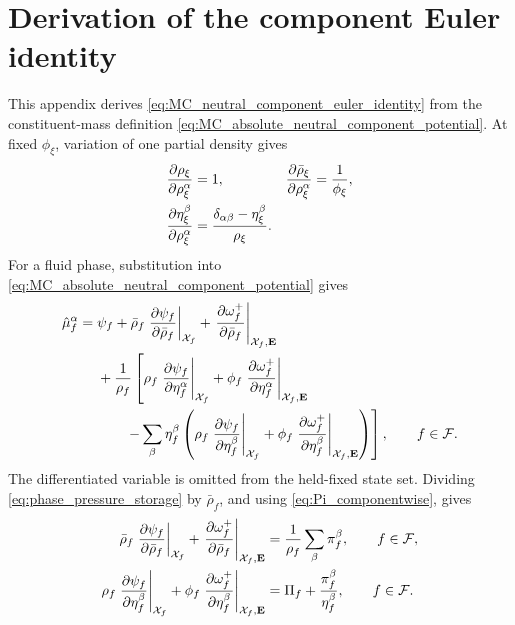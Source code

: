 \section{Derivation of the component Euler identity}
\label{app:component_potential_euler_derivation}

This appendix derives
\eqref{eq:MC_neutral_component_euler_identity} from the constituent-mass
definition \eqref{eq:MC_absolute_neutral_component_potential}.  At fixed
\(\phi_\xi\), variation of one partial density gives
%
\begin{subequations}
	\label{eq:appendix_component_density_chain_rule}
	\begin{align}
		\frac{\partial \rho_\xi}{\partial \rho_\xi^\alpha}
		&=1,
		&
		\frac{\partial \bar\rho_\xi}{\partial \rho_\xi^\alpha}
		&=\frac{1}{\phi_\xi},
		\label{eq:appendix_total_intrinsic_density_derivatives}
		\\
		\frac{\partial \eta_\xi^\beta}{\partial \rho_\xi^\alpha}
		&=
		\frac{
			\delta_{\alpha\beta}-\eta_\xi^\beta
		}{
			\rho_\xi
		}.
		\label{eq:appendix_mass_fraction_partial_density_derivative}
	\end{align}
\end{subequations}
%
For a fluid phase, substitution into
\eqref{eq:MC_absolute_neutral_component_potential} gives
%
\begin{align}
	\hat\mu_f^\alpha
	={} &
	\psi_f
	+
	\bar\rho_f
	\left.
	\frac{\partial \psi_f}{\partial \bar\rho_f}
	\right\vert_{\mathcal{X}_f}
	+
	\left.
	\frac{\partial \omega_f^+}{\partial \bar\rho_f}
	\right\vert_{\mathcal{X}_f,\mathbf{E}}
	\notag \\
	&+
	\frac{1}{\rho_f}
	\left[
		\rho_f
		\left.
		\frac{\partial \psi_f}{\partial \eta_f^\alpha}
		\right\vert_{\mathcal{X}_f}
		+
		\phi_f
		\left.
		\frac{\partial \omega_f^+}{\partial \eta_f^\alpha}
		\right\vert_{\mathcal{X}_f,\mathbf{E}}
	\right.
	\notag \\
	&\left.
	\qquad
		-\sum_\beta\eta_f^\beta
		\left(
			\rho_f
			\left.
			\frac{\partial \psi_f}{\partial \eta_f^\beta}
			\right\vert_{\mathcal{X}_f}
			+
			\phi_f
			\left.
			\frac{\partial \omega_f^+}{\partial \eta_f^\beta}
			\right\vert_{\mathcal{X}_f,\mathbf{E}}
			\right)
	\right],
	\qquad
	f\in\mathcal{F} .
	\label{eq:appendix_component_potential_chain_rule}
\end{align}
%
The differentiated variable is omitted from the held-fixed state set.
Dividing \eqref{eq:phase_pressure_storage} by \(\bar\rho_f\), and using
\eqref{eq:Pi_componentwise}, gives
%
\begin{subequations}
	\label{eq:appendix_component_stationarity_substitutions}
	\begin{align}
		\bar\rho_f
		\left.
		\frac{\partial \psi_f}{\partial \bar\rho_f}
		\right\vert_{\mathcal{X}_f}
		+
		\left.
		\frac{\partial \omega_f^+}{\partial \bar\rho_f}
		\right\vert_{\mathcal{X}_f,\mathbf{E}}
		&=
		\frac{1}{\rho_f}
		\sum_\beta\pi_f^\beta,
		\qquad
		f\in\mathcal{F},
		\label{eq:appendix_density_stationarity_substitution}
		\\
		\rho_f
		\left.
		\frac{\partial \psi_f}{\partial \eta_f^\beta}
		\right\vert_{\mathcal{X}_f}
		+
		\phi_f
		\left.
		\frac{\partial \omega_f^+}{\partial \eta_f^\beta}
		\right\vert_{\mathcal{X}_f,\mathbf{E}}
		&=
		\Pi_f
		+
		\frac{\pi_f^\beta}{\eta_f^\beta},
		\qquad
		f\in\mathcal{F} .
		\label{eq:appendix_composition_stationarity_substitution}
	\end{align}
\end{subequations}
